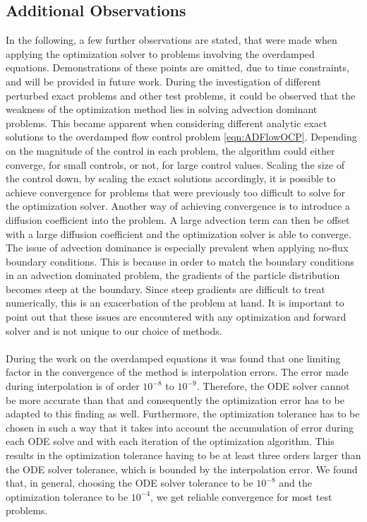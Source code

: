 \documentclass[11pt, a4paper]{article}
\theoremstyle{definition}
\begin{document}
\subsection{Additional Observations}
In the following, a few further observations are stated, that were made when applying the optimization solver to problems involving the overdamped equations. Demonstrations of these points are omitted, due to time constraints, and will be provided in future work.
During the investigation of different perturbed exact problems and other test problems, it could be observed that the weakness of the optimization method lies in solving advection dominant problems. 
This became apparent when considering different analytic exact solutions to the overdamped flow control problem \eqref{eqn:ADFlowOCP}. Depending on the magnitude of the control in each problem, the algorithm could either converge, for small controls, or not, for large control values. Scaling the size of the control down, by scaling the exact solutions accordingly, it is possible to achieve convergence for problems that were previously too difficult to solve for the optimization solver. Another way of achieving convergence is to introduce a diffusion coefficient into the problem. A large advection term can then be offset with a large diffusion coefficient and the optimization solver is able to converge.
The issue of advection dominance is especially prevalent when applying no-flux boundary conditions. This is because in order to match the boundary conditions in an advection dominated problem, the gradients of the particle distribution becomes steep at the boundary. Since steep gradients are difficult to treat numerically, this is an exacerbation of the problem at hand.
It is important to point out that these issues are encountered with any optimization and forward solver and is not unique to our choice of methods. 
\\
\\
During the work on the overdamped equations it was found that one limiting factor in the convergence of the method is interpolation errors. The error made during interpolation is of order $10^{-8}$ to $10^{-9}$. Therefore, the ODE solver cannot be more accurate than that and consequently the optimization error has to be adapted to this finding as well.
Furthermore, the optimization tolerance has to be chosen in such a way that it takes into account the accumulation of error during each ODE solve and with each iteration of the optimization algorithm. This results in the optimization tolerance having to be at least three orders larger than the ODE solver tolerance, which is bounded by the interpolation error. We found that, in general, choosing the ODE solver tolerance to be $10^{-8}$ and the optimization tolerance to be $10^{-4}$, we get reliable convergence for most test problems.
\end{document}
